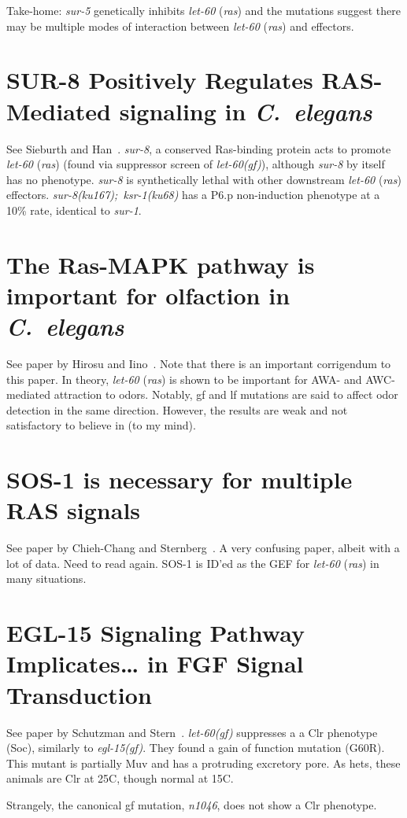\documentclass[10pt, onecolumn]{article}
\newcommand{\cel}{\emph{C.~elegans}}
\newcommand{\gene}[1]{\mbox{\emph{#1}}}
\newcommand{\ras}{\gene{let-60} (\emph{ras})}
\newcommand{\letgf}{\gene{let-60(gf)}}
\begin{document}
Take-home: \gene{sur-5} genetically inhibits \ras{} and the mutations suggest
there may be multiple modes of interaction between \ras{} and effectors.

\section*{SUR-8 Positively Regulates RAS-Mediated signaling in \cel{}}
See Sieburth and Han~\cite{Sieburth1998}. \gene{sur-8}, a conserved Ras-binding protein acts
to promote \ras{} (found via suppressor screen of \letgf{}), although
\gene{sur-8} by itself has no phenotype. \gene{sur-8} is synthetically lethal
with other downstream \ras{} effectors. \gene{sur-8(ku167); ksr-1(ku68)} has a
P6.p non-induction phenotype at a 10\% rate, identical to \gene{sur-1}.

\section*{The Ras-MAPK pathway is important for olfaction in \cel{}}
See paper by Hirosu and Iino~\cite{Iino2000}. Note that there is an important corrigendum
to this paper. In theory, \ras{} is shown to be important for AWA- and
AWC-mediated attraction to odors. Notably, gf and lf mutations are said to affect
odor detection in the same direction. However, the results are weak and not
satisfactory to believe in (to my mind).

\section*{SOS-1 is necessary for multiple RAS signals}
See paper by Chieh-Chang and Sternberg~\cite{Chang2000}. A very confusing paper, albeit
with a lot of data. Need to read again. SOS-1 is ID'ed as the GEF for \ras{} in
many situations.

\section*{EGL-15 Signaling Pathway Implicates\ldots{} in FGF Signal Transduction}
See paper by Schutzman and Stern~\cite{Schutzman2001}. \letgf{} suppresses a a Clr phenotype
(Soc), similarly to \gene{egl-15(gf)}. They found a gain of function mutation
(G60R). This mutant is partially Muv and has a protruding excretory pore. As
hets, these animals are Clr at 25\degree{}C, though normal at 15\degree{}C.

Strangely, the canonical gf mutation, \emph{n1046}, does not show a Clr phenotype.
\end{document}
